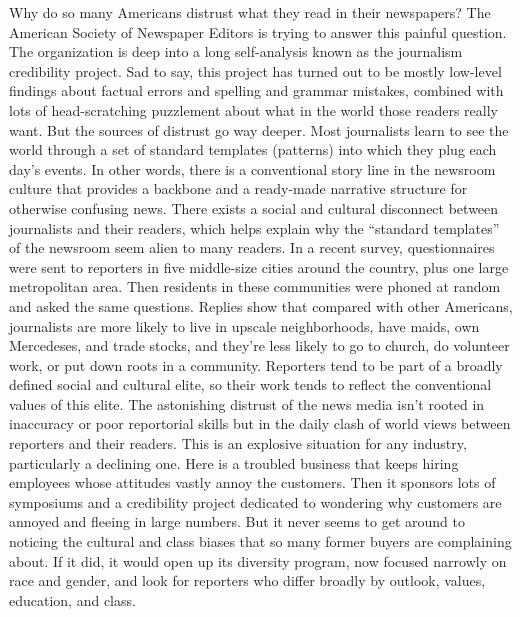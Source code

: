Why do so many Americans distrust what they read in their newspapers? The American Society of Newspaper Editors is trying to answer this painful question. The organization is deep into a long self-analysis known as the journalism credibility project.
Sad to say, this project has turned out to be mostly low-level findings about factual errors and spelling and grammar mistakes, combined with lots of head-scratching puzzlement about what in the world those readers really want.
But the sources of distrust go way deeper. Most journalists learn to see the world through a set of standard templates (patterns) into which they plug each day’s events. In other words, there is a conventional story line in the newsroom culture that provides a backbone and a ready-made narrative structure for otherwise confusing news.
There exists a social and cultural disconnect between journalists and their readers, which helps explain why the “standard templates” of the newsroom seem alien to many readers. In a recent survey, questionnaires were sent to reporters in five middle-size cities around the country, plus one large metropolitan area. Then residents in these communities were phoned at random and asked the same questions.
Replies show that compared with other Americans, journalists are more likely to live in upscale neighborhoods, have maids, own Mercedeses, and trade stocks, and they’re less likely to go to church, do volunteer work, or put down roots in a community.
Reporters tend to be part of a broadly defined social and cultural elite, so their work tends to reflect the conventional values of this elite. The astonishing distrust of the news media isn’t rooted in inaccuracy or poor reportorial skills but in the daily clash of world views between reporters and their readers.
This is an explosive situation for any industry, particularly a declining one. Here is a troubled business that keeps hiring employees whose attitudes vastly annoy the customers. Then it sponsors lots of symposiums and a credibility project dedicated to wondering why customers are annoyed and fleeing in large numbers. But it never seems to get around to noticing the cultural and class biases that so many former buyers are complaining about. If it did, it would open up its diversity program, now focused narrowly on race and gender, and look for reporters who differ broadly by outlook, values, education, and class.

